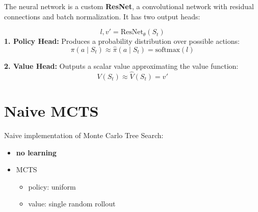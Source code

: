 \documentclass[aspectratio=169,xcolor=dvipsnames]{beamer}
\begin{document}

\begin{frame}{}
The neural network is a custom \textbf{ResNet}, a convolutional network with residual connections and batch normalization. It has two output heads:

\medskip
\[
l, v' = \text{ResNet}_\theta(S_t)
\]
\medskip
\textbf{1. Policy Head:} Produces a probability distribution over possible actions:
\[
\pi(a \mid S_t) \approx \hat{\pi}(a \mid S_t) = \text{softmax}(l)
\]

\textbf{2. Value Head:} Outputs a scalar value approximating the value function:
\[
V(S_t) \approx \hat{V}(S_t) = v'
\]

\end{frame}

\section{Naive MCTS}


\begin{frame}{}
    Naive implementation of Monte Carlo Tree Search:

    \medskip
    \begin{itemize}
    \item \textbf{no learning}
    \item MCTS
            \begin{itemize}
                \item policy: uniform
                \item value: single random rollout
            \end{itemize}
\end{itemize}

\end{frame}

\end{document}
